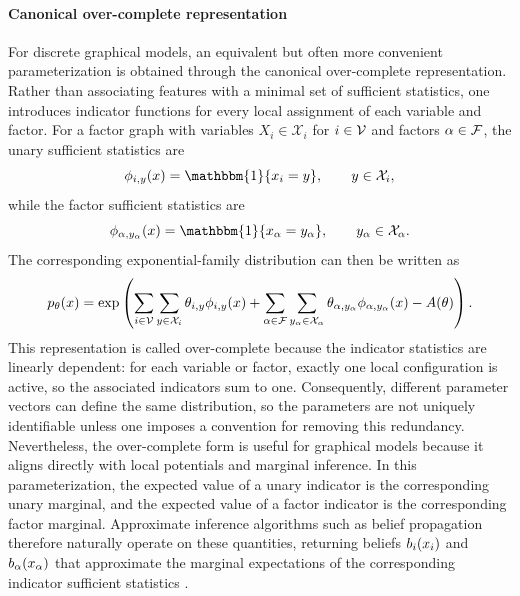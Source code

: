 \paragraph{Canonical over-complete representation}
For discrete graphical models, an equivalent but often more convenient parameterization is obtained through the canonical over-complete representation. Rather than associating features with a minimal set of sufficient statistics, one introduces indicator functions for every local assignment of each variable and factor. For a factor graph with variables $X_i \in \mathcal{X}_i$ for $i\in\mathcal{V}$ and factors $\alpha \in \mathcal{F}$, the unary sufficient statistics are
\begin{equation}
\SSTAT_{i,y}(x)=\mathbbm{1}\{x_i=y\}, \qquad y\in\mathcal{X}_i,
\end{equation}
while the factor sufficient statistics are
\begin{equation}
\SSTAT_{\FACTOR,y_{\FACTOR}}(\XVEC)=\mathbbm{1}\{\XFACT=y_{\FACTOR}\}, \qquad y_{\FACTOR}\in\mathcal{X}_{\FACTOR} .
\end{equation}
The corresponding exponential-family distribution can then be written as
\begin{equation}
p_{\theta}(x)
=
\exp\left(
\sum_{i\in \mathcal{V}}\sum_{y\in\mathcal{X}_i}\theta_{i,y}\phi_{i,y}(x)
+
\sum_{\alpha\in\mathcal{F}}\sum_{y_{\alpha}\in\mathcal{X}_{\alpha}}
\theta_{\alpha,y_{\alpha}}\phi_{\alpha,y_{\alpha}}(x)
-
A(\theta)
\right).
\end{equation}
This representation is called over-complete because the indicator statistics are linearly dependent: for each variable or factor, exactly one local configuration is active, so the associated indicators sum to one. Consequently, different parameter vectors can define the same distribution, so the parameters are not uniquely identifiable unless one imposes a convention for removing this redundancy. Nevertheless, the over-complete form is useful for graphical models because it aligns directly with local potentials and marginal inference. In this parameterization, the expected value of a unary indicator is the corresponding unary marginal, and the expected value of a factor indicator is the corresponding factor marginal. Approximate inference algorithms such as belief propagation therefore naturally operate on these quantities, returning beliefs $b_i(x_i)$ and $b_{\alpha}(x_{\alpha})$ that approximate the marginal expectations of the corresponding indicator sufficient statistics \citep{wainwright_graphical_2007}.

